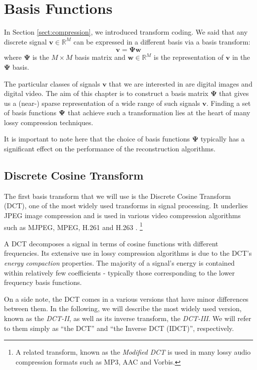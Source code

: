 \chapter{Basis Functions}
\label{ch:dwt}

In Section \ref{sect:compression}, we introduced transform coding.
We said that any discrete signal $\bm v \in \mathbb{R}^M$ can be expressed in a different basis via a basis transform:
\begin{equation*}
  \bm v = \bm\Psi\bm w
\end{equation*}
where $\bm\Psi$ is the $M\times M$ basis matrix and $\bm w \in\mathbb{R}^M$ is the representation of $\bm v$ in the $\bm\Psi$ basis.

The particular classes of signals $\bm v$ that we are interested in are digital images and digital video.
The aim of this chapter is to construct a basis matrix $\bm\Psi$ that gives us a (near-) sparse representation of a wide range of such signals $\bm v$.
Finding a set of basis functions $\boldsymbol\Psi$ that achieve such a transformation lies at the heart of many lossy compression techniques.

It is important to note here that the choice of basis functions $\bm \Psi$ typically has a significant effect on the performance of the reconstruction algorithms.

\section{Discrete Cosine Transform}
\label{sect:dct}
The first basis transform that we will use is the Discrete Cosine Transform (DCT), one of the most widely used transforms in signal processing.
It underlies JPEG image compression and is used in various video compression algorithms such as MJPEG, MPEG, H.261 and H.263 \cite{zeng2013}.
\footnote{A related transform, known as the \emph{Modified DCT} is used in many lossy audio compression formats such as MP3, AAC and Vorbis.}

A DCT decomposes a signal in terms of cosine functions with different frequencies.
Its extensive use in lossy compression algorithms is due to the DCT's \emph{energy compaction} properties.
The majority of a signal's energy is contained within relatively few coefficients - typically those corresponding to the lower frequency basis functions.

On a side note, the DCT comes in a various versions that have minor differences between them.
In the following, we will describe the most widely used version, known as the \emph{DCT-II}, as well as its inverse transform, the \emph{DCT-III}.
We will refer to them simply as ``the DCT'' and ``the Inverse DCT (IDCT)'', respectively.

